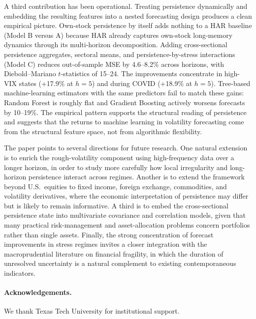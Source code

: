 \documentclass[11pt,a4paper]{article}
\begin{document}
A third contribution has been operational. Treating persistence
dynamically and embedding the resulting features into a nested
forecasting design produces a clean empirical picture. Own-stock
persistence by itself adds nothing to a HAR baseline (Model B versus A)
because HAR already captures own-stock long-memory dynamics through
its multi-horizon decomposition. Adding cross-sectional persistence
aggregates, sectoral means, and persistence-by-stress interactions
(Model C) reduces out-of-sample MSE by 4.6--8.2\% across horizons, with
Diebold--Mariano $t$-statistics of 15--24. The improvements concentrate
in high-VIX states (+17.9\% at $h=5$) and during COVID (+18.9\% at
$h=5$). Tree-based machine-learning estimators with the same predictors
fail to match these gains: Random Forest is roughly flat and Gradient
Boosting actively worsens forecasts by 10--19\%. The empirical pattern
supports the structural reading of persistence and suggests that the
returns to machine learning in volatility forecasting come from the
structural feature space, not from algorithmic flexibility.

The paper points to several directions for future research. One natural
extension is to enrich the rough-volatility component using
high-frequency data over a longer horizon, in order to study more
carefully how local irregularity and long-horizon persistence interact
across regimes. Another is to extend the framework beyond U.S.\
equities to fixed income, foreign exchange, commodities, and volatility
derivatives, where the economic interpretation of persistence may
differ but is likely to remain informative. A third is to embed the
cross-sectional persistence state into multivariate covariance and
correlation models, given that many practical risk-management and
asset-allocation problems concern portfolios rather than single
assets. Finally, the strong concentration of forecast improvements in
stress regimes invites a closer integration with the macroprudential
literature on financial fragility, in which the duration of
unresolved uncertainty is a natural complement to existing
contemporaneous indicators.

\paragraph{Acknowledgements.}
We thank Texas Tech University for institutional support.



\end{document}
